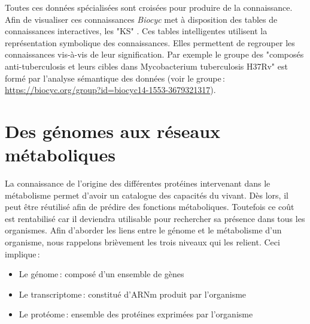 \begin{refsegment}
    
    Toutes ces données spécialisées sont croisées pour produire de la connaissance. Afin de visualiser ces connaissances \textit{Biocyc} met à disposition des tables de connaissances interactives, les "\gls{KS}" \cite{bat061SmartTable}. Ces tables intelligentes utilisent la représentation symbolique des connaissances. Elles permettent de regrouper les connaissances vis-à-vis de leur signification. Par exemple le groupe des "composés anti-tuberculosis  et leurs cibles dans  Mycobacterium tuberculosis H37Rv" est formé par l'analyse sémantique des données (voir le groupe : \url{https://biocyc.org/group?id=biocyc14-1553-3679321317}).
    
    
    
    
    \section{Des génomes aux réseaux métaboliques}
    
    La connaissance de l'origine des différentes protéines intervenant dans le métabolisme permet d'avoir un catalogue des capacités du vivant. Dès lors, il peut être réutilisé afin de prédire des fonctions métaboliques. Toutefois ce coût est rentabilisé car il deviendra utilisable pour rechercher sa présence dans tous les organismes. Afin d'aborder les liens entre le génome et le métabolisme d'un organisme, nous rappelons brièvement les trois niveaux qui les relient. Ceci implique :
    
    \begin{itemize}
        \item Le génome : composé d'un ensemble de gènes
        \item Le transcriptome : constitué d'\gls{ARNm} produit par l'organisme
        \item Le protéome : ensemble des protéines exprimées par l'organisme
    \end{itemize}
    

\end{refsegment}
